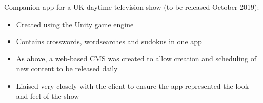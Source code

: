 \item Companion app for a UK daytime television show (to be released October 2019):
\begin{itemize}
    \item Created using the Unity game engine
    \item Contains crosswords, wordsearches and sudokus in one app
    \item As above, a web-based CMS was created to allow creation and scheduling of new content to be released daily
    \item Liaised very closely with the client to ensure the app represented the look and feel of the show
\end{itemize}

